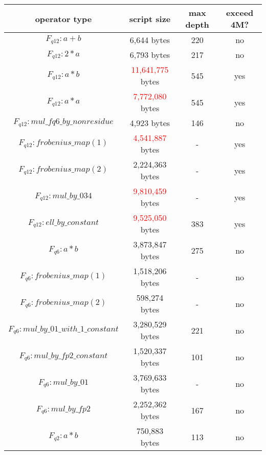 \begin{center}
\begin{tabular}{|c|c|c|c|} \hline
operator type & script size & max depth & exceed 4M? \\ \hline
$F_{q12}: a + b$ & 6,644 bytes & 220 & no  \\ \hline
$F_{q12}: 2 * a$ & 6,793 bytes & 217 & no \\ \hline
$F_{q12}: a * b$ & \textcolor{red}{11,641,775} bytes & 545 & yes \\ \hline
$F_{q12}: a * a$ & \textcolor{red}{7,772,080} bytes & 545 & yes \\ \hline
$F_{q12}: mul\_fq6\_by\_nonresidue$ & 4,923 bytes &	146 & no \\ \hline
$F_{q12}: frobenius\_map(1)$ & \textcolor{red}{4,541,887} bytes & - & yes \\ \hline
$F_{q12}: frobenius\_map(2)$ & 2,224,363 bytes & - & yes \\ \hline
$F_{q12}: mul\_by\_034$ & \textcolor{red}{9,810,459} bytes &	- & yes \\ \hline
$F_{q12}: ell\_by\_constant$ & \textcolor{red}{9,525,050} bytes & 383 & yes \\ \hline
$F_{q6}: a * b$ & 3,873,847 bytes &	275 & no \\ \hline
$F_{q6}: frobenius\_map(1)$ & 1,518,206 bytes &	- & no \\ \hline
$F_{q6}: frobenius\_map(2)$ & 598,274 bytes & - & no \\ \hline
$F_{q6}: mul\_by\_01\_with\_1\_constant$ & 3,280,529 bytes & 221 & no \\ \hline
$F_{q6}: mul\_by\_fp2\_constant$ & 1,520,337 bytes & 101 & no \\ \hline
$F_{q6}: mul\_by\_01$ & 3,769,633 bytes & - & no \\ \hline
$F_{q6}: mul\_by\_fp2$ & 2,252,362 bytes &	167 & no \\ \hline
$F_{q2}: a * b$ & 750,883 bytes & 113 & no \\ \hline

\end{tabular}
\end{center}
